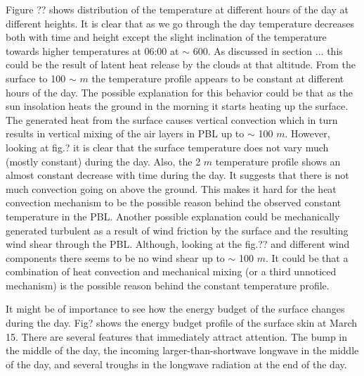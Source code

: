 \documentclass[a4paper,12pt]{article}
\numberwithin{equation}{section} %
\begin{document}
Figure ?? shows distribution of the temperature at different hours of the day at different heights. It is clear that as we go through the day temperature decreases both with time and height except the slight inclination of the temperature towards higher temperatures at 06:00 at $\sim$ 600. As discussed in section ... this could be the result of latent heat release by the clouds at that altitude. From the surface to 100 $\sim$ $m$ the temperature profile appears to be constant at different hours of the day. The possible explanation for this behavior could be that as the sun insolation heats the ground in the morning it starts heating up the surface. The generated heat from the surface causes vertical convection which in turn results in vertical mixing of the air layers in PBL up to $\sim$ 100 $m$. However, looking at fig.? it is clear that the surface temperature does not vary much (mostly constant) during the day. Also, the 2 $m$ temperature profile shows an almost constant decrease with time during the day. It suggests that there is not much convection going on above the ground. This makes it hard for the heat convection mechanism to be the possible reason behind the observed constant temperature in the PBL. Another possible explanation could be mechanically generated turbulent as a result of wind friction by the surface and the resulting wind shear through the PBL. Although, looking at the fig.?? and different wind components there seems to be no wind shear up to $\sim$ 100 $m$. It could be that a combination of heat convection and mechanical mixing (or a third unnoticed mechanism) is the possible reason behind the constant temperature profile.

It might be of importance to see how the energy budget of the surface changes during the day. Fig? shows the energy budget profile of the surface skin at March 15. There are several features that immediately attract attention. The bump in the middle of the day, the incoming larger-than-shortwave longwave in the middle of the day, and several troughs in the longwave radiation at the end of the day.
\end{document}
